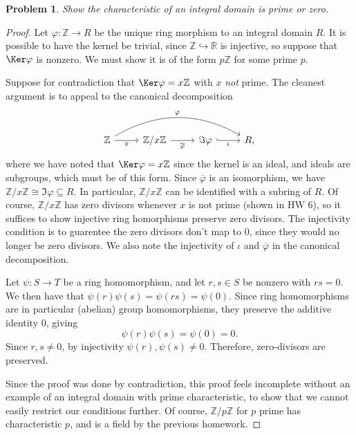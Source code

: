 \documentclass[11pt, letterpaper]{article}
\theoremstyle{plain}
\newtheorem{problem}{Problem}[section]
\begin{document}
\begin{problem}\label{10}
	Show the characteristic of an integral domain is prime or zero.
\end{problem}
\begin{proof}
	Let $\varphi : \mathbb{Z}  \to R$ be the unique ring morphism to an integral domain $R$. It is possible to have the kernel be trivial, since $\mathbb{Z} \hookrightarrow \mathbb{R} $ is injective, so suppose that $\Ker \varphi $ is nonzero. We must show it is of the form $p\mathbb{Z} $ for some prime $p$.

	Suppose for contradiction that $\Ker \varphi =x\mathbb{Z} $ with $x$ \emph{not} prime. The cleanest argument is to appeal to the canonical decomposition
	\[\begin{tikzcd}[row sep = 2.5em, column sep = 2.5em]
	\mathbb{Z} \ar[" \varphi  ", bend left, rrr] \ar[" \pi  "', r]  & \mathbb{Z} /x\mathbb{Z} \ar[" \overline{\varphi }  "', r]  & \Im \varphi \ar[" \iota  "', hook, r]  & R,
	\end{tikzcd}\]
	where we have noted that $\Ker \varphi=x\mathbb{Z} $ since the kernel is an ideal, and ideals are subgroups, which must be of this form. Since $\overline{\varphi } $ is an isomorphism, we have $\mathbb{Z} /x\mathbb{Z} \cong \Im \varphi \subseteq R$. In particular, $\mathbb{Z} /x\mathbb{Z} $ can be identified with a subring of $R$. Of course, $\mathbb{Z} /x\mathbb{Z} $ has zero divisors whenever $x$ is not prime (shown in HW 6), so it suffices to show injective ring homorphisms preserve zero divisors. The injectivity condition is to guarentee the zero divisors don't map to 0, since they would no longer be zero divisors. We also note the injectivity of $\iota $ and $\overline{\varphi } $ in the canonical decomposition.

	Let $\psi : S \to T$ be a ring homomorphism, and let $r,s\in S$ be nonzero with $rs=0$. We then have that $\psi (r)\psi (s)=\psi (rs)=\psi (0)$. Since ring homomorphisms are in particular (abelian) group homomorphisms, they preserve the additive identity 0, giving
	\[
		\psi (r)\psi (s)=\psi (0)=0
	.\]
	Since $r,s\neq 0$, by injectivity $\psi (r),\psi (s)\neq 0$. Therefore, zero-divisors are preserved.

	Since the proof was done by contradiction, this proof feels incomplete without an example of an integral domain with prime characteristic, to show that we cannot easily restrict our conditions further. Of course, $\mathbb{Z} /p\mathbb{Z} $ for $p$ prime has characteristic $p$, and is a field by the previous homework.
\end{proof}
\end{document}
